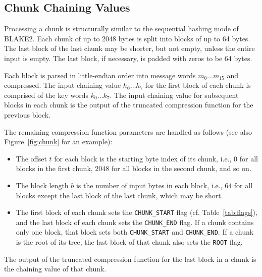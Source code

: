 \documentclass[12pt,notitlepage,a4paper]{article}
\begin{document}
\subsection{Chunk Chaining Values}\label{sec:chunk}

Processing a chunk is structurally similar to the sequential hashing mode of BLAKE2. Each chunk of up to 2048 bytes is split into blocks of up to 64 bytes.
The last block of the last chunk may be shorter, but not empty, unless the
entire input is empty. The last block, if necessary, is padded with zeros to be 64
bytes. 

Each block is parsed in little-endian order into message words $m_{0}
\ldots m_{15}$ and compressed. The input chaining value $h_{0} \ldots h_{7}$
for the first block of each chunk is comprised of the key words $k_{0} \ldots k_{7}$. The
input chaining value for subsequent blocks in each chunk is the output of the truncated
compression function for the previous block. 

The remaining compression function parameters are handled as follows (see also Figure~\ref{fig:chunk} for an example):
\begin{itemize}
\item The offset $t$ for each block is
the starting byte index of its chunk, i.e., $0$ for all blocks in the first chunk, $2048$
for all blocks in the second chunk, and so on. 
\item The block length $b$ is the
number of input bytes in each block, i.e., $64$ for all blocks except the last block of
the last chunk, which may be short. 
\item The first block of each chunk sets the
\texttt{CHUNK\_START} flag (cf. Table~\ref{tab:flags}), and the last block of each chunk sets the
\texttt{CHUNK\_END} flag. If a chunk contains only one block, that block sets
both \texttt{CHUNK\_START} and \texttt{CHUNK\_END}. If a chunk is the root of
its tree, the last block of that chunk also sets the \texttt{ROOT} flag.
\end{itemize}

The output of the truncated compression function for the last block in a chunk
is the chaining value of that chunk.
\end{document}
